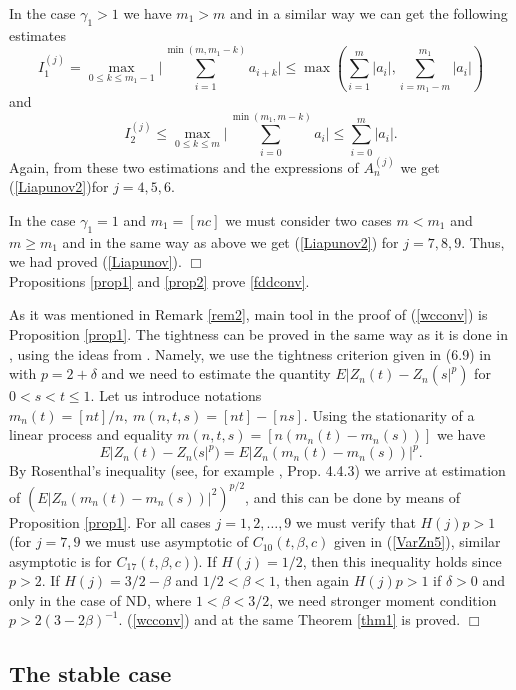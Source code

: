 \documentclass[12pt]{article}
\def\b{\beta}
\def\d{\delta}
\def\g{\gamma}
\newcommand{\halmos}{\vspace{3mm} \hfill \mbox{$\Box$}\\[2mm]}
\theoremstyle{plain}
\theoremstyle{definition}
\begin{document}
In the case $\g_1>1$ we have $m_1>m$ and in a similar way we can get the following estimates
$$
I_1^{(j)}=\max_{0\le k \le m_1-1}\Big |\sum_{i=1}^{\min (m, m_1-k)}a_{i+k}\Big |\le \max \left (\sum_{i=1}^{ m}|a_{i}|, \sum_{i=m_1-m}^{ m_1}|a_{i}| \right )
$$
and
$$
I_2^{(j)}\le \max_{0\le k \le m}\Big |\sum_{i=0}^{\min (m_1, m-k)}a_{i}\Big |\le \sum_{i=0}^{ m}|a_{i}|.
$$
Again, from these two estimations and the expressions of $A_n^{(j)}$ we get (\ref{Liapunov2})for $j=4, 5, 6.$

In the case $\g_1=1$ and $m_1=[nc]$ we must consider two cases $m<m_1$ and $m\ge  m_1$ and in the same way as above we  get (\ref{Liapunov2}) for $j=7, 8, 9.$ Thus, we had proved (\ref{Liapunov}).
\halmos
Propositions \ref{prop1} and \ref{prop2} prove  \ref{fddconv}.

As it was mentioned in Remark \ref{rem2}, main tool in the proof of (\ref{wcconv}) is Proposition \ref{prop1}. The tightness can be proved in the same way as it is done in \cite{Sabzikar}, using the ideas from \cite{Billingsley}. Namely, we use the tightness criterion given in  (6.9) in \cite{Sabzikar} with $p=2+\d$ and we need to estimate the quantity $E|Z_n(t)-Z_n(s|^p)$ for $0<s<t\le 1$. Let us introduce notations $m_n(t)=[nt]/n, \ m(n, t,s)=[nt]-[ns]$. Using the stationarity of a linear process and equality $m(n, t,s)=[n(m_n(t)-m_n(s))]$ we have
$$
E|Z_n(t)-Z_n(s|^p)=E|Z_n (m_n(t)-m_n(s))|^p.
$$
By Rosenthal's inequality (see, for example \cite{Giraitis}, Prop. 4.4.3) we arrive at estimation of $\left (E|Z_n (m_n(t)-m_n(s))|^2\right )^{p/2}$, and this can be done by means of Proposition \ref{prop1}. For all cases $j=1, 2,\dots, 9$ we must verify that $H(j)p>1$ (for $j=7, 9$ we must use asymptotic of $C_{10}(t, \b, c)$ given in (\ref{VarZn5}), similar asymptotic is for $C_{17}(t, \b, c)$). If $H(j)=1/2$, then this inequality holds since $p>2$. If $H(j)=3/2-\b$ and $1/2<\b<1$, then again $H(j)p>1$ if $\d>0$ and only in the case of ND, where $1<\b <3/2$, we need stronger moment condition $p>2 (3-2\b)^{-1}$. (\ref{wcconv}) and at the same Theorem \ref{thm1} is proved.
\halmos



\subsection{The stable case}\label{subsec2}
\end{document}
